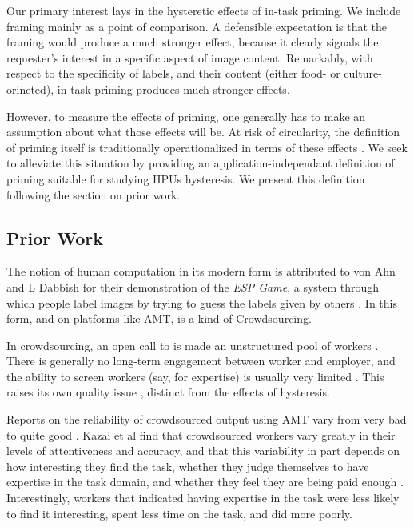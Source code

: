 \documentclass[a4paper]{report}
\begin{document}
Our primary interest lays in the hysteretic effects of in-task priming.  We
include framing mainly as a point of comparison.  A defensible expectation is
that the framing would produce a much stronger effect, because it clearly 
signals the requester's interest in a specific aspect of image content. 
Remarkably, with respect to the specificity of labels, and their content 
(either food- or culture-orineted), in-task priming produces much stronger 
effects.

However, to measure the effects of priming, one generally has to make an 
assumption about what those effects will be.  At risk of circularity, the 
definition of priming itself is traditionally operationalized in terms 
of these effects \cite{}.  We seek to alleviate this 
situation by providing an application-independant definition of priming 
suitable for studying HPUs hysteresis.  We 
present this definition following the section on prior work.

\subsection*{Prior Work}

The notion of human computation in its modern form is attributed to von Ahn 
and L Dabbish for their demonstration of the \textit{ESP Game}, a system 
through which people label images by trying to guess the labels given by 
others \cite{von2004labeling}.  In this form, and on platforms like AMT,
is a kind of Crowdsourcing.  

In crowdsourcing, an open call to is made an unstructured pool of workers 
\cite{howe2008crowdsourcing}.  There is generally no long-term engagement 
between worker and employer, and the ability 
to screen workers (say, for expertise) is usually very limited 
\cite{howe2008crowdsourcing}.  This raises its own quality issue 
\cite{lease2011quality}, distinct from the effects of hysteresis. 

Reports on the reliability of crowdsourced output using AMT vary from very
bad \cite{marsden2009crowdsourcing} to quite good 
\cite{alonso2009can, grady2010crowdsourcing}. Kazai et al find that 
crowdsourced workers vary
greatly in their levels of attentiveness and accuracy, and that this 
variability in part depends on how interesting they find the task, whether they
judge
themselves to have expertise in the task domain, and whether they feel they
are being paid enough \cite{kazai2013analysis}.  Interestingly, workers that
indicated having expertise in the task were less likely to find it interesting,
spent less time on the task, and did more poorly.
\end{document}
